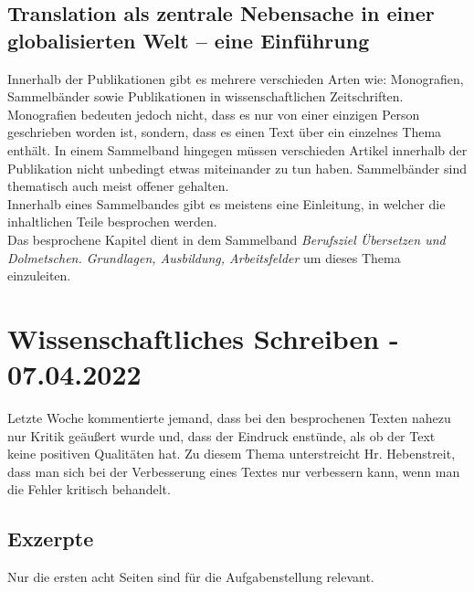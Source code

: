 \documentclass{article}
\begin{document}
	\subsection{Translation als zentrale Nebensache in einer globalisierten Welt – eine Einführung}
	Innerhalb der Publikationen gibt es mehrere verschieden Arten wie: Monografien, Sammelbänder sowie Publikationen in wissenschaftlichen Zeitschriften. Monografien bedeuten jedoch nicht, dass es nur von einer einzigen Person geschrieben worden ist, sondern, dass es einen Text über ein einzelnes Thema enthält. In einem Sammelband hingegen müssen verschieden Artikel innerhalb der Publikation nicht unbedingt etwas miteinander zu tun haben. Sammelbänder sind thematisch auch meist offener gehalten.\\
	Innerhalb eines Sammelbandes gibt es meistens eine Einleitung, in welcher die inhaltlichen Teile besprochen werden. \\
	Das besprochene Kapitel dient in dem Sammelband \textit{Berufsziel Übersetzen und Dolmetschen. Grundlagen, Ausbildung, Arbeitsfelder} um dieses Thema einzuleiten.

	\section{Wissenschaftliches Schreiben - 07.04.2022}

	Letzte Woche kommentierte jemand, dass bei den besprochenen Texten nahezu nur Kritik geäußert wurde und, dass der Eindruck enstünde, als ob der Text keine positiven Qualitäten hat. Zu diesem Thema unterstreicht Hr. Hebenstreit, dass man sich bei der Verbesserung eines Textes nur verbessern kann, wenn man die Fehler kritisch behandelt. \\
	\subsection{Exzerpte}
	Nur die ersten acht Seiten sind für die Aufgabenstellung relevant.
\end{document}
